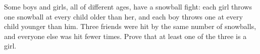 Some boys and girls, all of different ages, have a snowball fight: each girl throws one snowball at every child older than her, and each boy throws one at every child younger than him. Three friends were hit by the same number of snowballs, and everyone else was hit fewer times. Prove that at least one of the three is a girl.
